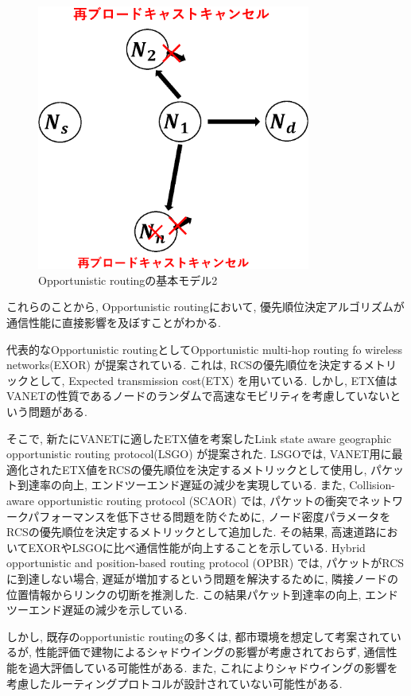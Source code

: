\documentclass[10pt]{jreport}
\begin{document}
\begin{figure}[!ht]
	\centering
	\includegraphics[width=90mm]{figures/basic-opportunity2.eps}
	\caption{Opportunistic routingの基本モデル2}
	\label{fig:Basic2}
\end{figure}

これらのことから, Opportunistic routingにおいて, 優先順位決定アルゴリズムが通信性能に直接影響を及ぼすことがわかる.

代表的なOpportunistic routingとしてOpportunistic multi-hop routing fo wireless networks(EXOR) \cite{16}が提案されている. これは, RCSの優先順位を決定するメトリックとして, Expected transmission cost(ETX) \cite{21}を用いている. しかし, ETX値はVANETの性質であるノードのランダムで高速なモビリティを考慮していないという問題がある.

そこで, 新たにVANETに適したETX値を考案したLink state aware geographic opportunistic routing protocol(LSGO) \cite{18}が提案された. LSGOでは, VANET用に最適化されたETX値をRCSの優先順位を決定するメトリックとして使用し, パケット到達率の向上, エンドツーエンド遅延の減少を実現している. また, Collision-aware opportunistic routing protocol (SCAOR) \cite{22}では, パケットの衝突でネットワークパフォーマンスを低下させる問題を防ぐために, ノード密度パラメータをRCSの優先順位を決定するメトリックとして追加した. その結果, 高速道路においてEXORやLSGOに比べ通信性能が向上することを示している. Hybrid opportunistic and position-based routing  protocol (OPBR) \cite{23}では, パケットがRCSに到達しない場合, 遅延が増加するという問題を解決するために, 隣接ノードの位置情報からリンクの切断を推測した. この結果パケット到達率の向上, エンドツーエンド遅延の減少を示している.

しかし, 既存のopportunistic routingの多くは, 都市環境を想定して考案されているが, 性能評価で建物によるシャドウイングの影響が考慮されておらず, 通信性能を過大評価している可能性がある. また, これによりシャドウイングの影響を考慮したルーティングプロトコルが設計されていない可能性がある. 
\end{document}

